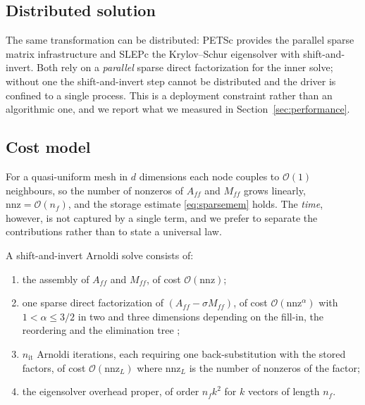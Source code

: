 \documentclass[pdflatex,sn-mathphys-num]{sn-jnl}
\theoremstyle{thmstyleone}%
\theoremstyle{thmstyletwo}%
\theoremstyle{thmstylethree}%
\begin{document}
\subsection{Distributed solution}

The same transformation can be distributed: PETSc \cite{petsc2023} provides the
parallel sparse matrix infrastructure and SLEPc \cite{hernandez2005} the
Krylov--Schur eigensolver with shift-and-invert. Both rely on a \emph{parallel}
sparse direct factorization for the inner solve; without one the
shift-and-invert step cannot be distributed and the driver is confined to a
single process. This is a deployment constraint rather than an algorithmic one,
and we report what we measured in Section~\ref{sec:performance}.

\subsection{Cost model}\label{sec:costmodel}

For a quasi-uniform mesh in $d$ dimensions each node couples to $\mathcal{O}(1)$
neighbours, so the number of nonzeros of $A_{ff}$ and $M_{ff}$ grows linearly,
$\mathrm{nnz} = \mathcal{O}(n_f)$, and the storage estimate \eqref{eq:sparsemem}
holds. The \emph{time}, however, is not captured by a single term, and we prefer
to separate the contributions rather than to state a universal law.

A shift-and-invert Arnoldi solve consists of:
\begin{enumerate}
  \item the assembly of $A_{ff}$ and $M_{ff}$, of cost $\mathcal{O}(\mathrm{nnz})$;
  \item one sparse direct factorization of $(A_{ff}-\sigma M_{ff})$, of cost
        $\mathcal{O}(\mathrm{nnz}^{\alpha})$ with
        $1 < \alpha \le 3/2$ in two and three dimensions depending on the
        fill-in, the reordering and the elimination tree \cite{davis2006};
  \item $n_{\mathrm{it}}$ Arnoldi iterations, each requiring one back-substitution
        with the stored factors, of cost $\mathcal{O}(\mathrm{nnz}_L)$ where
        $\mathrm{nnz}_L$ is the number of nonzeros of the factor;
  \item the eigensolver overhead proper, of order $n_f k^2$ for $k$ vectors of
        length $n_f$.
\end{enumerate}
\end{document}
